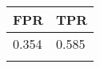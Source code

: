 \begin{tabular}{ll}
\hline
 FPR   & TPR   \\
\hline
 0.354 & 0.585 \\
       &       \\
\hline
\end{tabular}